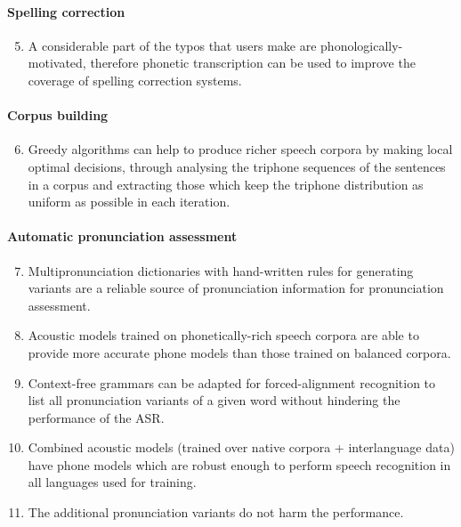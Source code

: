 \bigskip
\paragraph*{Spelling correction}
  \begin{enumerate}
    \setcounter{enumi}{4}
    \item A considerable part of the typos that users make are phonologically-motivated, therefore phonetic transcription can be used to improve the coverage of spelling correction systems.
  \end{enumerate}

  
\paragraph*{Corpus building}
  \begin{enumerate}
    \setcounter{enumi}{5}
    \item Greedy algorithms can help to produce richer speech corpora by making local optimal decisions, through analysing the triphone sequences of the sentences in a corpus and extracting those which keep the triphone distribution as uniform as possible in each iteration.
  \end{enumerate}

  
\paragraph*{Automatic pronunciation assessment}
  \begin{enumerate}
    \setcounter{enumi}{6}
    \item Multipronunciation dictionaries with hand-written rules for generating variants are a reliable source of pronunciation information for pronunciation assessment.
    \item Acoustic models trained on phonetically-rich speech corpora are able to provide more accurate phone models than those trained on balanced corpora.
    \item Context-free grammars can be adapted for forced-alignment recognition to list all pronunciation variants of a given word without hindering the performance of the \ac{ASR}.
    \item Combined acoustic models (trained over native corpora + interlanguage data) have phone models which are robust enough to perform speech recognition in all languages used for training.
    \item The additional pronunciation variants do not harm the performance.
  \end{enumerate}

